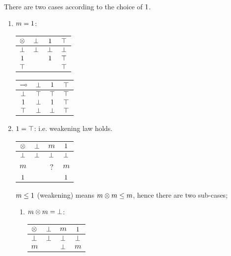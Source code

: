 \begin{example} 

There are two cases according to the choice of $\mbox{\boldmath{1}}$. 
\begin{enumerate}
\item {\em $m = \mbox{\boldmath{1}}$}:
\begin{center}
   \begin{tabular}{c|ccc}
  $\otimes$ & $\bot$ &  $\mbox{\boldmath{1}}$  & $\top$ \\ \hline
  $\bot$  &  $\bot$ & $\bot$  & $\bot$   \\
  $\mbox{\boldmath{1}}$  &     & $\mbox{\boldmath{1}}$  & $\top$  \\
  $\top$   &     &     & $\top$  \\
\end{tabular}
\hskip 48pt
\begin{tabular}{c|ccc}
  $\multimap$   & $\bot$ & $\mbox{\boldmath{1}}$ & $\top$  \\ \hline
  $\bot$  & $\top$ & $\top$ & $\top$ \\
  $\mbox{\boldmath{1}}$   & $\bot$ & $\mbox{\boldmath{1}}$ & $\top$ \\
  $\top$  & $\bot$ & $\bot$ & $\top$ \\
\end{tabular}
\end{center}
\item {\em $\mbox{\boldmath{1}} = \top$}:  i.e. weakening law holds.
\begin{center}
\begin{tabular}{c|ccc}
  $\otimes$ & $\bot$ &  $m$  & $\mbox{\boldmath{1}}$ \\ \hline
  $\bot$  &  $\bot$ & $\bot$  & $\bot$   \\
  $m$  &     & ?  & $m$  \\
  $\mbox{\boldmath{1}}$   &     &     & $\mbox{\boldmath{1}}$  \\
\end{tabular}
\end{center}
$m \leq \mbox{\boldmath{1}}$ (weakening) means $m \otimes m \leq m$, hence there are two sub-cases;
\begin{enumerate}
%
\item {\em $m \otimes m = \bot$}:
\begin{tabular}{c|ccc}
  $\otimes$ & $\bot$ &  $m$  & $\mbox{\boldmath{1}}$ \\ \hline
  $\bot$  &  $\bot$ & $\bot$  & $\bot$   \\
  $m$  &     & $\bot$  & $m$  \\

\end{tabular}
\end{enumerate}
\end{enumerate}
\end{example}
